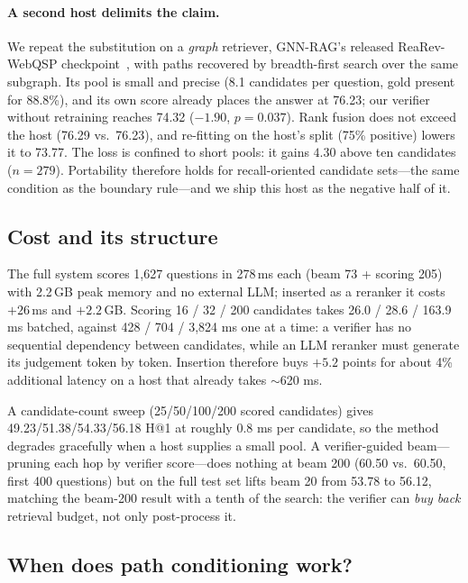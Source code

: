 \documentclass[sigconf,review]{acmart}
\begin{document}
\paragraph{A second host delimits the claim.}
We repeat the substitution on a \emph{graph} retriever, GNN-RAG's released ReaRev-WebQSP checkpoint~\cite{mavromatis2024gnnrag}, with paths recovered by breadth-first search over the same subgraph. Its pool is small and precise (8.1 candidates per question, gold present for 88.8\%), and its own score already places the answer at 76.23; our verifier without retraining reaches 74.32 ($-1.90$, $p=0.037$). Rank fusion does not exceed the host (76.29 vs.\ 76.23), and re-fitting on the host's split (75\% positive) lowers it to 73.77. The loss is confined to short pools: it gains $4.30$ above ten candidates ($n=279$). Portability therefore holds for recall-oriented candidate sets---the same condition as the boundary rule---and we ship this host as the negative half of it.

\subsection{Cost and its structure}
\label{sec:cost}

The full system scores 1,627 questions in 278\,ms each (beam 73 + scoring 205) with 2.2\,GB peak memory and no external LLM; inserted as a reranker it costs $+26$\,ms and $+2.2$\,GB. Scoring 16 / 32 / 200 candidates takes 26.0 / 28.6 / 163.9 ms batched, against 428 / 704 / 3,824 ms one at a time: a verifier has no sequential dependency between candidates, while an LLM reranker must generate its judgement token by token. Insertion therefore buys $+5.2$ points for about 4\% additional latency on a host that already takes $\sim$620 ms.

A candidate-count sweep (25/50/100/200 scored candidates) gives 49.23/51.38/54.33/56.18 H@1 at roughly 0.8 ms per candidate, so the method degrades gracefully when a host supplies a small pool. A verifier-guided beam---pruning each hop by verifier score---does nothing at beam 200 (60.50 vs.\ 60.50, first 400 questions) but on the full test set lifts beam 20 from 53.78 to 56.12, matching the beam-200 result with a tenth of the search: the verifier can \emph{buy back} retrieval budget, not only post-process it.

\subsection{When does path conditioning work?}
\label{sec:boundary}
\end{document}
